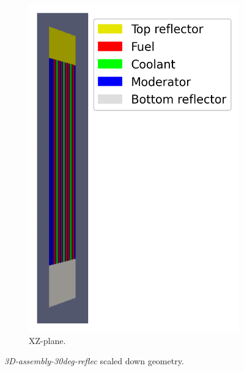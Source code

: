 \documentclass[11pt,letterpaper]{article}
\begin{document}
\begin{figure}[htbp!]
\begin{subfigure}[t]{0.4\textwidth}
			\includegraphics[width=\linewidth]{3D-assembly-30deg-reflec-meshB2}
			\caption{XZ-plane.}
		\end{subfigure}
		\hfill
		\caption{\textit{3D-assembly-30deg-reflec} scaled down geometry.}
		\label{fig:3D-assembly}
	\end{figure}
\end{document}
